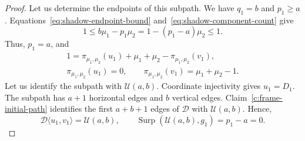 \begin{proof}
Let us determine the endpoints of this subpath.
We have $q_1=b$ and $p_1\ge a$.
Equations~\eqref{eq:shadow-endpoint-bound} and~\eqref{eq:shadow-component-count} give
\[
 1\le b\mu_1-p_1\mu_2
 =1-(p_1-a)\mu_2\le1.
\]
Thus, $p_1=a$, and
\[
 \begin{gathered}
 1=\pi_{\mu_1,\mu_2}(u_1)+\mu_1+\mu_2-\pi_{\mu_1,\mu_2}(v_1),\\
 \pi_{\mu_1,\mu_2}(u_1)=0,\qquad
 \pi_{\mu_1,\mu_2}(v_1)=\mu_1+\mu_2-1.
 \end{gathered}
\]
Let us identify the subpath with $\mathcal U(a,b)$.
Coordinate injectivity gives $u_1=D_1$.
The subpath has $a+1$ horizontal edges and $b$ vertical edges.
Claim~\ref{c:frame-initial-path} identifies the first $a+b+1$ edges of $\mathcal D$ with $\mathcal U(a,b)$.
Hence,
\[
 \mathcal D\langle u_1,v_1\rangle=\mathcal U(a,b),\qquad
 \operatorname{Surp}(\mathcal U(a,b),g_1)=p_1-a=0.
\]
\end{proof}

